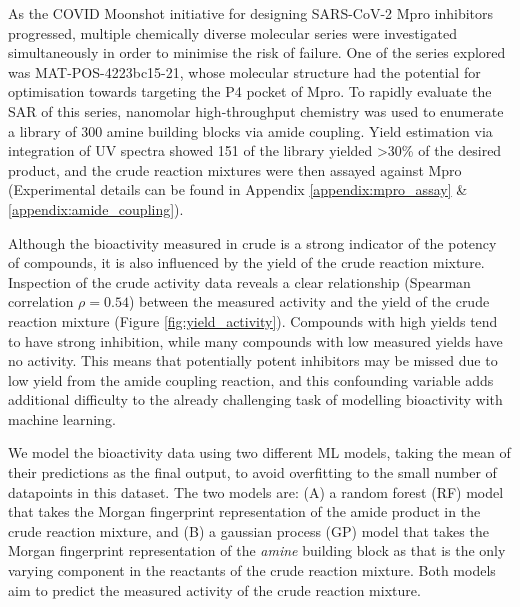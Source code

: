 As the COVID Moonshot initiative for designing SARS-CoV-2 Mpro inhibitors progressed, multiple chemically diverse molecular series were investigated simultaneously in order to minimise the risk of failure. One of the series explored was MAT-POS-4223bc15-21, whose molecular structure had the potential for optimisation towards targeting the P4 pocket of Mpro. To rapidly evaluate the SAR of this series, nanomolar high-throughput chemistry was used to enumerate a library of 300 amine building blocks via amide coupling. Yield estimation via integration of UV spectra showed 151 of the library yielded >30\% of the desired product, and the crude reaction mixtures were then assayed against Mpro (Experimental details can be found in Appendix \ref{appendix:mpro_assay} \& \ref{appendix:amide_coupling}).

Although the bioactivity measured in crude is a strong indicator of the potency of compounds, it is also influenced by the yield of the crude reaction mixture. Inspection of the crude activity data reveals a clear relationship (Spearman correlation $\rho = 0.54$) between the measured activity and the yield of the crude reaction mixture (Figure \ref{fig:yield_activity}). Compounds with high yields tend to have strong inhibition, while many compounds with low measured yields have no activity. This means that potentially potent inhibitors may be missed due to low yield from the amide coupling reaction, and this confounding variable adds additional difficulty to the already challenging task of modelling bioactivity with machine learning. 

We model the bioactivity data using two different ML models, taking the mean of their predictions as the final output, to avoid overfitting to the small number of datapoints in this dataset. The two models are: (A) a random forest (RF) model that takes the Morgan fingerprint representation of the amide product in the crude reaction mixture, and (B) a gaussian process (GP) model that takes the Morgan fingerprint representation of the \textit{amine} building block as that is the only varying component in the reactants of the crude reaction mixture. Both models aim to predict the measured activity of the crude reaction mixture.

